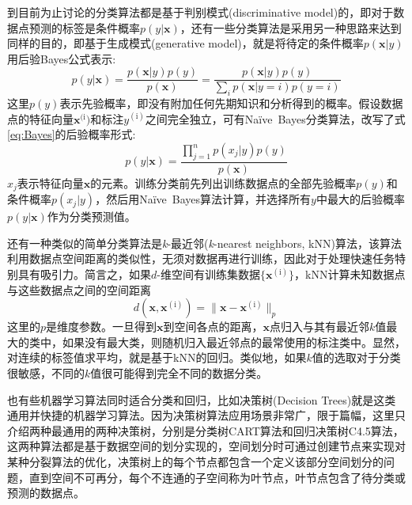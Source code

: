 \documentclass[10pt, oneside, a4paper]{article}      %
\newcommand{\upcite}[1]{\hspace{0ex}\textsuperscript{\cite{#1}}} %
\begin{document}
到目前为止讨论的分类算法都是基于判别模式\textrm{(discriminative model)}的，即对于数据点预测的标签是条件概率$p(y|\mathbf{x})$，还有一些分类算法是采用另一种思路来达到同样的目的，即基于生成模式\textrm{(generative model)}，就是将待定的条件概率$p(\mathbf{x}|y)$用后验\textrm{Bayes}公式表示:
\begin{equation}
	p(y|\mathbf{x})=\dfrac{p(\mathbf{x}|y)p(y)}{p(\mathbf{x})}=\dfrac{p(\mathbf{x}|y)p(y)}{\sum\limits_ip(\mathbf{x}|y=i)p(y=i)}
	\label{eq:Bayes}
\end{equation}
这里$p(y)$表示先验概率，即没有附加任何先期知识和分析得到的概率。假设数据点的特征向量$\mathbf{x}^{(\mathrm{i}})$和标注$y^{(\mathrm{i})}$之间完全独立，可有\textrm{Na\"ive~Bayes}分类算法\upcite{Naive-Bayes}，改写了式\eqref{eq:Bayes}的后验概率形式:
\begin{equation}
	p(y|\mathbf{x})=\dfrac{\prod\limits_{j=1}^np(x_j|y)p(y)}{p(\mathbf{x})}
	\label{eq:Naive-Bayes}
\end{equation}
$x_j$表示特征向量$\mathbf{x}$的元素。训练分类前先列出训练数据点的全部先验概率$p(y)$和条件概率$p(x_j|y)$，然后用\textrm{Na\"ive~Bayes}算法计算，并选择所有$y$中最大的后验概率$p(y|\mathbf{x})$作为分类预测值。

还有一种类似的简单分类算法是\textit{k}-最近邻(\textit{k}-\textrm{nearest neighbors, kNN})算法，该算法利用数据点空间距离的类似性，无须对数据再进行训练，因此对于处理快速任务特别具有吸引力。简言之，如果$d$-维空间有训练集数据$\{\mathbf{x}^{(\mathrm{i})}\}$，\textrm{kNN}计算未知数据点与这些数据点之间的空间距离
\begin{displaymath}
	d(\mathbf{x},\mathbf{x}^{(\mathrm{i})})=\|\mathbf{x}-\mathbf{x}^{(\mathrm{i})}\|_p
\end{displaymath}
这里的$p$是维度参数。一旦得到$\mathbf{x}$到空间各点的距离，$\mathbf{x}$点归入与其有最近邻$k$值最大的类中，如果没有最大类，则随机归入最近邻点的最常使用的标注类中。显然，对连续的标签值求平均，就是基于\textrm{kNN}的回归。类似地，如果$k$值的选取对于分类很敏感，不同的$k$值很可能得到完全不同的数据分类。

也有些机器学习算法同时适合分类和回归，比如决策树\textrm{(Decision Trees)}就是这类通用并快捷的机器学习算法。因为决策树算法应用场景非常广，限于篇幅，这里只介绍两种最通用的两种决策树，分别是分类树\textrm{CART}算法\upcite{ML_CART}和回归决策树\textrm{C4.5}算法\upcite{ML_C4.5}，这两种算法都是基于数据空间的划分实现的，空间划分时可通过创建节点来实现对某种分裂算法的优化，决策树上的每个节点都包含一个定义该部分空间划分的问题，直到空间不可再分，每个不连通的子空间称为叶节点，叶节点包含了待分类或预测的数据点。
\end{document}
